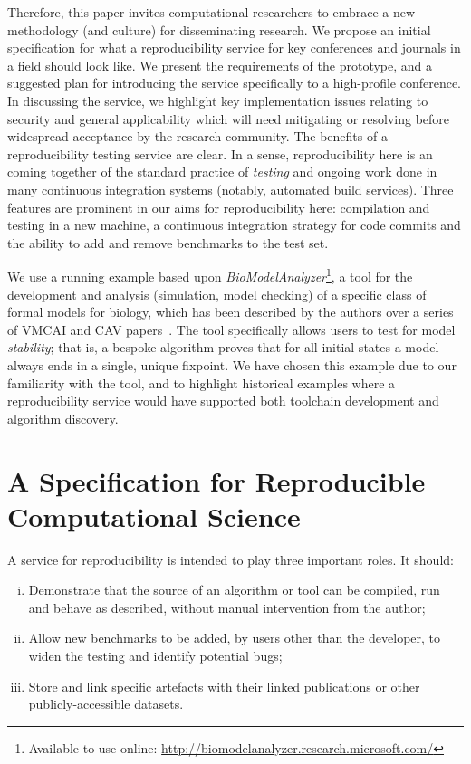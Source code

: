 \documentclass[conference]{IEEEtran}
\begin{document}
Therefore, this paper invites computational researchers to embrace a
new methodology (and culture) for disseminating research. We propose an initial
specification for what a reproducibility service for key conferences and
journals in a field should look like. We present the requirements of the prototype,
and a suggested plan for introducing the service specifically to a high-profile
conference. In discussing the service, we highlight
key implementation issues relating to security and general
applicability which will need mitigating or resolving before
widespread acceptance by the research community.  The benefits of a
reproducibility testing service are clear. In a sense,
reproducibility here is an coming together of the standard practice of
\emph{testing} and ongoing work done in many continuous integration
systems (notably, automated build services). Three features are
prominent in our aims for reproducibility here: compilation and
testing in a new machine, a continuous integration strategy for code
commits and the ability to add and remove benchmarks to the test set.

We use a running example based upon
{\emph{BioModelAnalyzer}}\footnote{Available to use online:
\url{http://biomodelanalyzer.research.microsoft.com/}}, a tool for the
development and analysis (simulation, model checking) of a specific
class of formal models for biology, which has been described by the
authors over a series of VMCAI and CAV
papers~\cite{cook-et-al:2011,benque-et-al:2012,cook-et-al:2014}.  The
tool specifically allows users to test for model \emph{stability};
that is, a bespoke algorithm proves that for all initial states a
model always ends in a single, unique fixpoint. We have chosen this
example due to our familiarity with the tool, and to highlight
historical examples where a reproducibility service would have
supported both toolchain development and algorithm discovery.

\section{A Specification for Reproducible Computational Science}\label{spec}

A service for reproducibility is intended to play three important
roles. It should:

\begin{enumerate}[(i)]
\item Demonstrate that the source of an algorithm or tool can be
  compiled, run and behave as described, without manual intervention
  from the author; 
\item Allow new benchmarks to be added, by users other than
the developer, to widen the testing and identify potential bugs; 
\item Store and link specific artefacts with their linked
publications or other publicly-accessible datasets. 
\end{enumerate}
\end{document}
